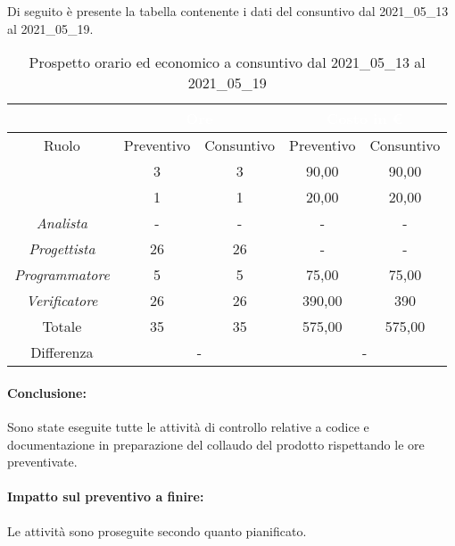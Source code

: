 Di seguito è presente la tabella contenente i dati del consuntivo dal 2021\_05\_13 al 2021\_05\_19.
\begin{table}[H]
	\centering
	\begin{tabular}{|c|c|c|c|c|}
		\rowcolor{darkblue} 
		&\multicolumn{2}{c|}{\textcolor{white}{Ore}}&\multicolumn{2}{c|}{\textcolor{white}{Costo in €}}\\ \hline
		Ruolo				&	Preventivo			&	Consuntivo		&	Preventivo	&	Consuntivo\\ \hline
		{\Responsabile}		&	3					&	3				&	90,00		&	90,00 \\ \hline
		{\Amministratore}	&	1					&	1				&	20,00		&	20,00 \\ \hline
		\textit{Analista}	&	-					&	-		&	-			&	- \\ \hline
		\textit{Progettista}& 	26					&   26 				& 	-		&  	- \\ \hline
		\textit{Programmatore}& 5					& 	5				& 	75,00		&  	75,00 \\ \hline
		\textit{Verificatore}&	26					&	26				&	390,00		&	390 \\ \hline
		Totale				&	35					&	35				&	575,00		&	575,00 \\ \hline
		Differenza			& 	\multicolumn{2}{c|}{-} 				&\multicolumn{2}{c|}{-}\\ \hline
	\end{tabular}
	\caption{Prospetto orario ed economico a consuntivo dal 2021\_05\_13 al 2021\_05\_19}
\end{table}
\paragraph*{Conclusione:}
Sono state eseguite tutte le attività di controllo relative a codice e documentazione in preparazione del collaudo del prodotto rispettando le ore preventivate.
\paragraph*{Impatto sul preventivo a finire:}
Le attività sono proseguite secondo quanto pianificato.